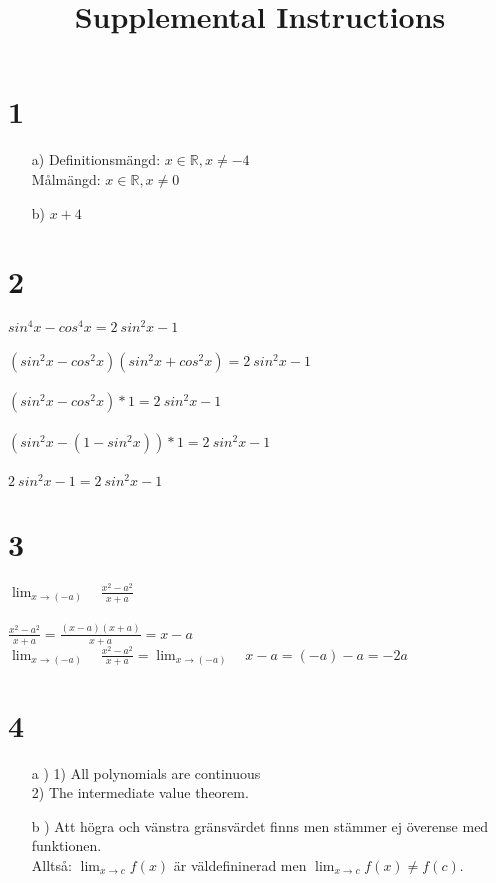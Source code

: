 \documentclass{article}
\title{Supplemental Instructions}
\date{
     }
\begin{document}
\maketitle

\section*{1}
\begin{itemize}
	\item[a) ]	Definitionsmängd: $x \in \mathbb{R}, x \neq -4$ \\
				Målmängd: $x \in \mathbb{R}, x \neq 0$
				
	\item[b) ] 	$x + 4$			
\end{itemize}
\section*{2}
$sin^4 x - cos^4 x = 2 \> sin^2 x - 1$	\\ \\
$(sin^2 x - cos^2 x)(sin^2 x + cos^2 x) = 2 \> sin^2 x - 1$ \\ \\
$(sin^2 x - cos^2 x) * 1 = 2 \> sin^2 x - 1$ \\ \\
$(sin^2 x - (1-sin^2 x)) * 1 = 2 \> sin^2 x - 1$ \\ \\
$2 \> sin^2 x - 1 = 2 \> sin^2 x - 1$ \\ 
\section*{3}
$\lim_{x \to (-a)} \quad \frac{x^2 - a^2}{x + a}$ \\ \\
$\frac{x^2 - a^2}{x + a} = \frac{(x - a)(x + a)}{x + a} = x - a$ \\ 
$\lim_{x \to (-a)} \quad \frac{x^2 - a^2}{x + a} =
\lim_{x \to (-a)} \quad x - a = (-a) - a = -2a$ 

\section*{4}
\begin{itemize}
\item[a )]
1) All polynomials are continuous \\
2) The intermediate value theorem. 
\item[b )]
Att högra och vänstra gränsvärdet finns men stämmer ej överense med funktionen.
\\
Alltså: $\lim_{x \to c} f(x)$ är väldefininerad men
$\lim_{x \to c} f(x) \neq f(c)$.
\end{itemize}
\end{document}
